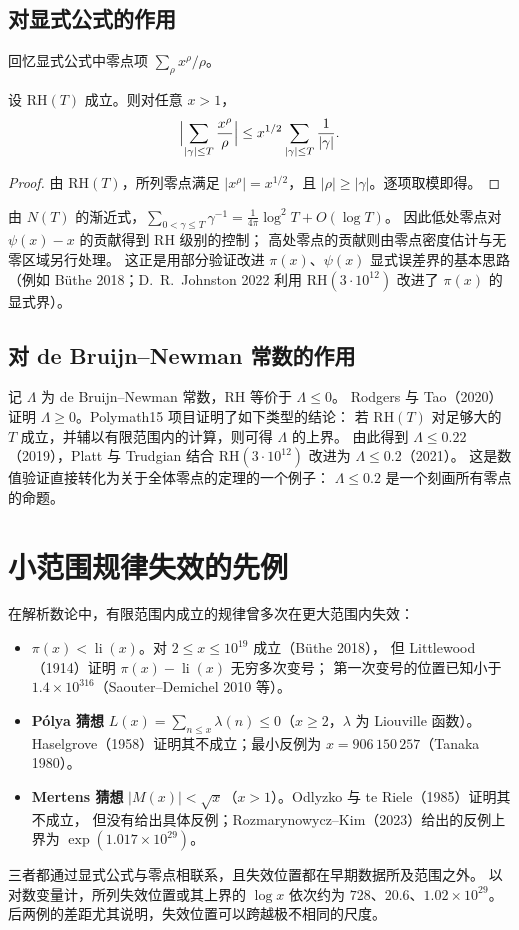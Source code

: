 \documentclass[11pt]{article}
\begin{document}
\subsection{对显式公式的作用}
回忆显式公式中零点项 $\sum_\rho x^\rho/\rho$。
\begin{proposition}\label{prop:lowzeros}
设 $\mathrm{RH}(T)$ 成立。则对任意 $x>1$，
\[
 \Bigl|\sum_{|\gamma|\le T}\frac{x^\rho}{\rho}\Bigr|\le
 x^{1/2}\sum_{|\gamma|\le T}\frac1{|\gamma|}.
\]
\end{proposition}
\begin{proof}
由 $\mathrm{RH}(T)$，所列零点满足 $|x^\rho|=x^{1/2}$，且 $|\rho|\ge|\gamma|$。逐项取模即得。
\end{proof}
由 $N(T)$ 的渐近式，$\sum_{0<\gamma\le T}\gamma^{-1}=\tfrac1{4\pi}\log^2T+O(\log T)$。
因此低处零点对 $\psi(x)-x$ 的贡献得到 RH 级别的控制；
高处零点的贡献则由零点密度估计与无零区域另行处理。
这正是用部分验证改进 $\pi(x)$、$\psi(x)$ 显式误差界的基本思路
（例如 Büthe 2018；D.\ R.\ Johnston 2022 利用 $\mathrm{RH}(3\cdot10^{12})$ 改进了 $\pi(x)$ 的显式界）。

\subsection{对 de Bruijn--Newman 常数的作用}
记 $\Lambda$ 为 de Bruijn--Newman 常数，RH 等价于 $\Lambda\le0$。
Rodgers 与 Tao（2020）证明 $\Lambda\ge0$。Polymath15 项目证明了如下类型的结论：
若 $\mathrm{RH}(T)$ 对足够大的 $T$ 成立，并辅以有限范围内的计算，则可得 $\Lambda$ 的上界。
由此得到 $\Lambda\le0.22$（2019），Platt 与 Trudgian 结合 $\mathrm{RH}(3\cdot10^{12})$ 改进为 $\Lambda\le0.2$（2021）。
这是数值验证直接转化为关于全体零点的定理的一个例子：
$\Lambda\le0.2$ 是一个刻画所有零点的命题。

\section{小范围规律失效的先例}
在解析数论中，有限范围内成立的规律曾多次在更大范围内失效：
\begin{itemize}
 \item \textbf{$\pi(x)<\operatorname{li}(x)$}。对 $2\le x\le10^{19}$ 成立（Büthe 2018），
 但 Littlewood（1914）证明 $\pi(x)-\operatorname{li}(x)$ 无穷多次变号；
 第一次变号的位置已知小于 $1.4\times10^{316}$（Saouter--Demichel 2010 等）。
 \item \textbf{Pólya 猜想} $L(x)=\sum_{n\le x}\lambda(n)\le0$（$x\ge2$，$\lambda$ 为 Liouville 函数）。
 Haselgrove（1958）证明其不成立；最小反例为 $x=906\,150\,257$（Tanaka 1980）。
 \item \textbf{Mertens 猜想} $|M(x)|<\sqrt x$（$x>1$）。Odlyzko 与 te Riele（1985）证明其不成立，
 但没有给出具体反例；Rozmarynowycz--Kim（2023）给出的反例上界为 $\exp(1.017\times10^{29})$。
\end{itemize}
三者都通过显式公式与零点相联系，且失效位置都在早期数据所及范围之外。
以对数变量计，所列失效位置或其上界的 $\log x$ 依次约为 $728$、$20.6$、$1.02\times10^{29}$。
后两例的差距尤其说明，失效位置可以跨越极不相同的尺度。
\end{document}
